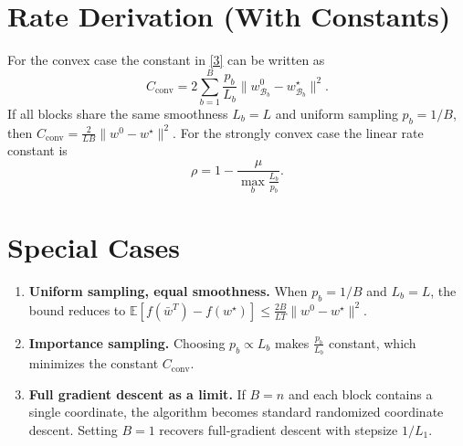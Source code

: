 \documentclass[11pt]{article}
\newcommand{\E}{\mathbb{E}}
\begin{document}
\section*{Rate Derivation (With Constants)}
For the convex case the constant in \eqref{3} can be written as
\[
C_{\text{conv}}=
2\sum_{b=1}^{B}\frac{p_{b}}{L_{b}}
\|w^{0}_{\mathcal{B}_{b}}-w^{\star}_{\mathcal{B}_{b}}\|^{2}.
\]
If all blocks share the same smoothness $L_{b}=L$ and uniform sampling
$p_{b}=1/B$, then $C_{\text{conv}}=\frac{2}{L B}\|w^{0}-w^{\star}\|^{2}$.
For the strongly convex case the linear rate constant is
\[
\rho=1-\frac{\mu}{\displaystyle\max_{b}\frac{L_{b}}{p_{b}}}.
\]

\section*{Special Cases}
\begin{enumerate}[label=\arabic*.]
\item \textbf{Uniform sampling, equal smoothness.}
When $p_{b}=1/B$ and $L_{b}=L$, the bound reduces to
$\E[f(\bar w^{T})-f(w^{\star})]\le
\frac{2B}{L T}\|w^{0}-w^{\star}\|^{2}$.
\item \textbf{Importance sampling.}
Choosing $p_{b}\propto L_{b}$ makes $\frac{p_{b}}{L_{b}}$ constant,
which minimizes the constant $C_{\text{conv}}$.
\item \textbf{Full gradient descent as a limit.}
If $B=n$ and each block contains a single coordinate, the algorithm
becomes standard randomized coordinate descent.  Setting $B=1$ recovers
full‑gradient descent with stepsize $1/L_{1}$.
\end{enumerate}
\end{document}
